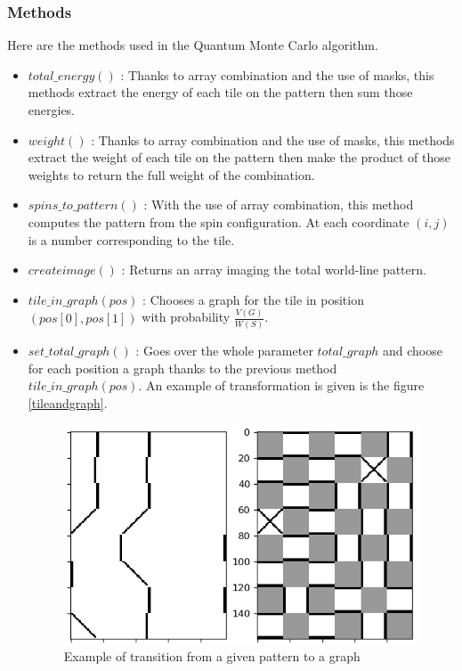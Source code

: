 \documentclass[a4paper,12pt,twoside]{article}
\begin{document}
	\subsubsection{Methods}
	Here are the methods used in the Quantum Monte Carlo algorithm. 
	\begin{itemize}[label=$\star$]
		\item $total\_energy()$ : Thanks to array combination and the use of masks, this methods extract the energy of each tile on the pattern then sum those energies.
		\item $weight()$ : Thanks to array combination and the use of masks, this methods extract the weight of each tile on the pattern then make the product of those weights to return the full weight of the combination.
		\item $spins\_to\_pattern()$ : With the use of array combination, this method computes the pattern from the spin configuration. At each coordinate $(i,j)$ is a number corresponding to the tile.
		\item $createimage()$ : Returns an array imaging the total world-line pattern.
		\item $tile\_in\_graph(pos)$ : Chooses a graph for the tile in position \\ $(pos[0], pos[1])$ with probability $\frac{V(G)}{W(S)}$.
		\item $set\_total\_graph()$ : Goes over the whole parameter $total\_graph$ and choose for each position a graph thanks to the previous method \\ $tile\_in\_graph(pos)$. An example of transformation is given is the figure \ref{tileandgraph}.
		\begin{figure}[!h]
			\centering
			\includegraphics[]{tileandgraph.png}
			\caption{Example of transition from a given pattern to a graph}

\end{figure}
\end{itemize}
\end{document}

